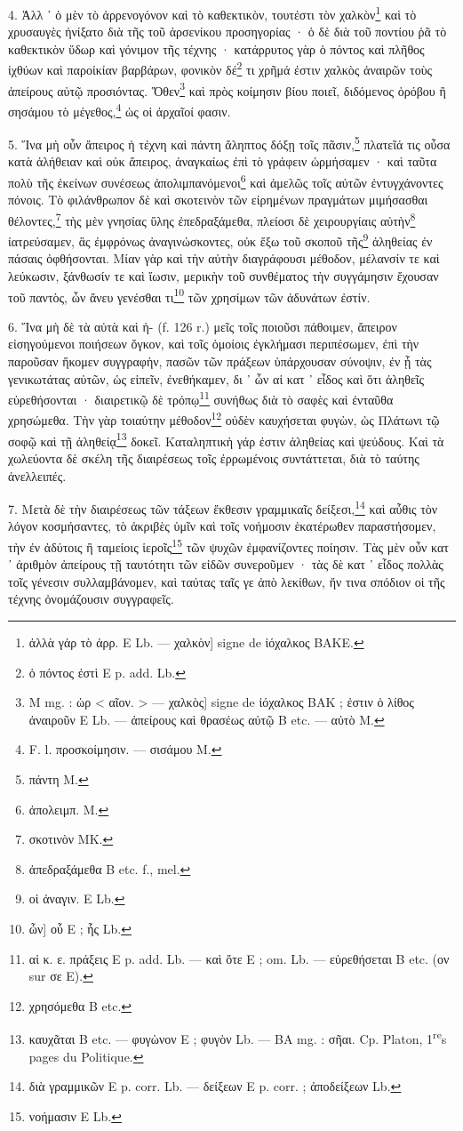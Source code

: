 \documentclass[a4paper, 11pt, oneside, polutonikogreek, french]{article}
\begin{document}
4. Ἀλλ ᾽ ὁ μὲν τὸ ἀρρενογόνον καὶ τὸ καθεκτικὸν, τουτέστι τὸν χαλκὸν\footnote{ἀλλὰ γἀρ τὸ ἀρρ. E Lb. --- χαλκὸν] signe de ἰόχαλκος BAKE.} καὶ τὸ χρυσαυγὲς ἠνίξατο διὰ τῆς τοῦ ἀρσενίκου προσηγορίας · ὁ δὲ διὰ τοῦ ποντίου ῥᾶ τὸ καθεκτικὸν ὕδωρ καὶ γόνιμον τῆς τέχνης · κατάρρυτος γὰρ ὁ πόντος καὶ πλῆθος ἰχθύων καὶ παροἰκίαν βαρβάρων, φονικὸν δέ\footnote{ὁ πόντος ἐστὶ E p. add. Lb.} τι χρῆμά ἐστιν χαλκὸς ἀναιρῶν τοὺς ἀπείρους αὐτῷ προσιόντας. Ὅθεν\footnote{M mg. : ὡρ < αῖον. > --- χαλκὸς] signe de ἰόχαλκος BAK ; ἐστιν ὁ λίθος ἀναιροῦν E Lb. --- ἀπείρους καὶ θρασέως αὐτῷ B etc. --- αὐτὸ M.} καὶ πρὸς κοίμησιν βίου ποιεῖ, διδόμενος ὀρόβου ἢ σησάμου τὸ μέγεθος,\footnote{F. l. προσκοίμησιν. --- σισάμου M.} ὡς οἱ ἀρχαῖοί φασιν.

5. Ἵνα μὴ οὖν ἄπειρος ἡ τέχνη καὶ πάντη ἄληπτος δόξῃ τοῖς πᾶσιν,\footnote{πάντη M.} πλατεῖά τις οὖσα κατὰ ἀλήθειαν καὶ οὐκ ἄπειρος, ἀναγκαίως ἐπὶ τὸ γράφειν ὡρμήσαμεν · καὶ ταῦτα πολὺ τῆς ἐκείνων συνέσεως ἀπολιμπανόμενοι\footnote{ἀπολειμπ. M.} καὶ ἀμελῶς τοῖς αὐτῶν ἐντυγχάνοντες πόνοις. Τὸ φιλάνθρωπον δὲ καὶ σκοτεινὸν τῶν εἰρημένων πραγμάτων μιμήσασθαι θέλοντες,\footnote{σκοτινὸν MK.} τὴς μὲν γνησίας ὕλης ἐπεδραξάμεθα, πλείοσι δὲ χειρουργίαις αὐτὴν\footnote{ἀπεδραξάμεθα B etc. f., mel.} ἰατρεύσαμεν, ἃς ἐμφρόνως ἀναγινώσκοντες, οὐκ ἔξω τοῦ σκοποῦ τῆς\footnote{οἱ ἀναγιν. E Lb.} ἀληθείας ἐν πάσαις ὀφθήσονται. Μίαν γὰρ καὶ τὴν αὐτὴν διαγράφουσι μέθοδον, μέλανσίν τε καὶ λεύκωσιν, ξάνθωσίν τε καὶ ἴωσιν, μερικὴν τοῦ συνθέματος τὴν συγγάμησιν ἔχουσαν τοῦ παντὸς, ὧν ἄνευ γενέσθαι τι\footnote{ὧν] οὗ E ; ἧς Lb.} τῶν χρησίμων τῶν ἀδυνάτων ἐστίν.

6. Ἵνα μὴ δὲ τὰ αὐτὰ καὶ ἡ- (f. 126 r.) μεῖς τοῖς ποιοῦσι πάθοιμεν, ἄπειρον εἰσηγούμενοι ποιήσεων ὄγκον, καὶ τοῖς ὁμοίοις ἐγκλήμασι περιπέσωμεν, ἐπὶ τὴν παροῦσαν ἥκομεν συγγραφὴν, πασῶν τῶν πράξεων ὑπάρχουσαν σύνοψιν, ἐν ᾗ τὰς γενικωτάτας αὐτῶν, ὡς εἰπεῖν, ἐνεθήκαμεν, δι ᾽ ὧν αἱ κατ ᾽ εἶδος καὶ ὅτι ἀληθεῖς εὑρεθήσονται · διαιρετικῷ δὲ τρόπῳ\footnote{αἱ κ. ε. πράξεις E p. add. Lb. --- καὶ ὅτε E ; om. Lb. --- εὑρεθήσεται B etc. (ον sur σε E).} συνήθως διὰ τὸ σαφὲς καὶ ἐνταῦθα χρησώμεθα. Τὴν γὰρ τοιαύτην μέθοδον\footnote{χρησόμεθα B etc.} οὐδὲν καυχήσεται φυγὼν, ὡς Πλάτωνι τῷ σοφῷ καὶ τῇ ἀληθείᾳ\footnote{καυχᾶται B etc. --- φυγὼνον E ; φυγὸν Lb. --- BA mg. : σῆαι. Cp. Platon, 1\textsuperscript{re}s pages du Politique.} δοκεῖ. Καταληπτικὴ γάρ ἐστιν ἀληθείας καὶ ψεύδους. Καὶ τὰ χωλεύοντα δὲ σκέλη τῆς διαιρέσεως τοῖς ἐρρωμένοις συντάττεται, διὰ τὸ ταύτης ἀνελλειπές.

7. Μετὰ δὲ τὴν διαιρέσεως τῶν τάξεων ἔκθεσιν γραμμικαῖς δείξεσι,\footnote{διὰ γραμμικῶν E p. corr. Lb. --- δείξεων E p. corr. ; ἀποδείξεων Lb.} καὶ αὖθις τὸν λόγον κοσμήσαντες, τὸ ἀκριβὲς ὑμῖν καὶ τοῖς νοήμοσιν ἑκατέρωθεν παραστήσομεν, τὴν ἐν ἀδύτοις ἢ ταμείοις ἱεροῖς\footnote{νοήμασιν E Lb.} τῶν ψυχῶν ἐμφανίζοντες ποίησιν. Τὰς μὲν οὖν κατ ᾽ ἀριθμὸν ἀπείρους τῇ ταυτότητι τῶν εἰδῶν συνεροῦμεν · τὰς δὲ κατ ᾽ εἶδος πολλὰς τοῖς γένεσιν συλλαμβάνομεν, καὶ ταύτας ταῖς γε ἀπὸ λεκίθων, ἥν τινα σπόδιον οἱ τῆς τέχνης ὀνομάζουσιν συγγραφεῖς.
\end{document}
